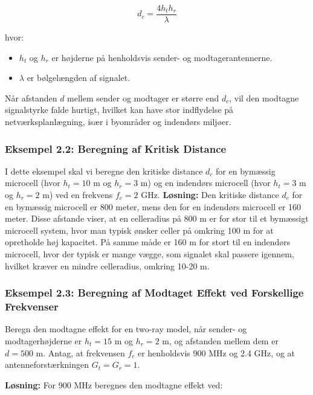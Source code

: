 \documentclass[a4paper,12pt]{book}
\begin{document}
	\[
	d_c = \frac{4h_t h_r}{\lambda}
	\]
	
	\noindent hvor:
	\begin{itemize}
		\item \( h_t \) og \( h_r \) er højderne på henholdsvis sender- og modtagerantennerne.
		\item \( \lambda \) er bølgelængden af signalet.
	\end{itemize}
	
	\noindent Når afstanden \( d \) mellem sender og modtager er større end \( d_c \), vil den modtagne signalstyrke falde hurtigt, hvilket kan have stor indflydelse på netværksplanlægning, især i byområder og indendørs miljøer.
	
	\subsubsection{Eksempel 2.2: Beregning af Kritisk Distance}
	
	\noindent I dette eksempel skal vi beregne den kritiske distance \( d_c \) for en bymæssig microcell (hvor \( h_t = 10 \) m og \( h_r = 3 \) m) og en indendørs microcell (hvor \( h_t = 3 \) m og \( h_r = 2 \) m) ved en frekvens \( f_c = 2 \) GHz.
	\newline\newline
	\noindent \textbf{Løsning:} Den kritiske distance \( d_c \) for en bymæssig microcell er 800 meter, mens den for en indendørs microcell er 160 meter. Disse afstande viser, at en celleradius på 800 m er for stor til et bymæssigt microcell system, hvor man typisk ønsker celler på omkring 100 m for at opretholde høj kapacitet. På samme måde er 160 m for stort til en indendørs microcell, hvor der typisk er mange vægge, som signalet skal passere igennem, hvilket kræver en mindre celleradius, omkring 10-20 m.
	
	\subsubsection{Eksempel 2.3: Beregning af Modtaget Effekt ved Forskellige Frekvenser}
	
	\noindent Beregn den modtagne effekt for en two-ray model, når sender- og modtagerhøjderne er \( h_t = 15 \) m og \( h_r = 2 \) m, og afstanden mellem dem er \( d = 500 \) m. Antag, at frekvensen \( f_c \) er henholdsvis 900 MHz og 2.4 GHz, og at antenneforstærkningen \( G_t = G_r = 1 \).
	
	\noindent \textbf{Løsning:} For 900 MHz beregnes den modtagne effekt ved:
	
\end{document}
